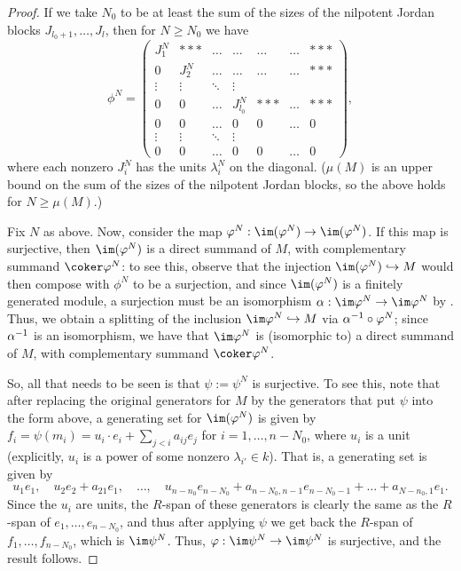 \documentclass[12pt]{article}
\let\l\lambda
\let\inc\hookrightarrow
\theoremstyle{theorem}
\numberwithin{thm}{section}
\theoremstyle{definition}
\begin{document}
\begin{proof}
  If we take $N_0  $ to be at least the sum of the sizes of the nilpotent Jordan blocks $J_{l_0+1},\dots,J_l$, then for $N\geq N_0$ we have
  $$
  \phi^N =
  \begin{pmatrix}
    J_1^N & *** &\dots & \dots& \dots  &\dots & *** \\
    0 & J_2^N & \dots &\dots&\dots & \dots& *** \\
    \vdots &\vdots & \ddots &\vdots \\
    0 & 0 & \dots & J_{l_0}^N & *** & \dots & ***\\
    0 & 0 & \dots & 0 & 0 & \dots & 0\\
    \vdots &\vdots & \ddots &\vdots \\
    0 & 0 & \dots & 0 & 0 & \dots & 0
  \end{pmatrix},
  $$
  where each nonzero $J_i^N$ has the units $\l_i^N$ on the diagonal.
  ($\mu(M)$ is an upper bound on the sum of the sizes of the nilpotent Jordan blocks, so the above holds for $N\geq \mu(M)$.)

  Fix $N$ as above.
  Now, consider the map $ \phi^N: \im(\phi^N) \to \im(\phi^N)$. If this map is surjective, then $\im(\phi^N)$ is a direct summand of $M$, with complementary summand $\coker \phi^N$: to see this, observe that the injection $\im(\phi^N) \inc M$ would then  compose with $\phi^N$ to be a surjection, and since $\im(\phi^N)$ is a finitely generated module, a surjection must be an isomorphism $\a:\im \phi^N \to \im \phi^N$ by \cite[Corollary~4.4]{Eisenbud95}. Thus, we obtain a splitting of the inclusion $\im \phi^N \inc M$ via $\alpha^{-1}\circ \varphi^N$; since $\alpha^{-1}$ is an isomorphism, we have that $\im \phi^N$ is (isomorphic to) a direct summand of $M$, with complementary summand $\coker \phi^N$.

  So, all that needs to be seen is that $\psi:=\psi^N$ is surjective.
  To see this, note that after replacing the original generators for $M$ by the generators that put $\psi$ into the form above,  a generating set for $\im(\phi^N)$ is given by $f_i = \psi(m_i) = u_i\cdot e_i + \sum_{j<i } a_{ij} e_j$ for $i = 1,\dots,n-N_0$, where $u_i$ is a unit (explicitly, $u_i$ is a power of some nonzero $\l_{i'}\in k$).
  That is, a generating set is given by
  $$u_1 e_1,\quad  u_2 e_2+a_{21}e_1,\quad \dots ,\quad u_{n-n_0}e_{n-N_0}+a_{n-N_0,n-1}e_{n-N_0-1}+\dots + a_{N-n_0,1}e_1.$$
  Since the $u_i$ are units, the $R$-span of these generators is clearly the same as the $R$-span of $e_1,\dots,e_{n-N_0}$, and thus after applying $\psi$ we get back the $R$-span of $f_1,\dots,f_{n-N_0} $, which is $\im \psi^N$. Thus, $\phi: \im \psi^N \to \im \psi^N$ is surjective, and the result follows.
\end{proof}
\end{document}

